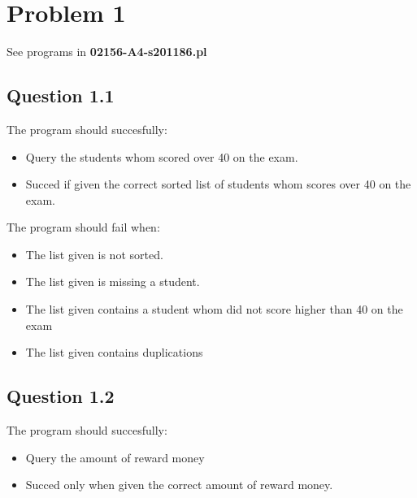 \newpage
\section*{Problem 1}
See programs in \textbf{02156-A4-s201186.pl}

\subsection*{Question 1.1}
The program should succesfully:
\begin{itemize}
    \item Query the students whom scored over 40 on the exam.
    \item Succed if given the correct sorted list of students whom scores over 40 on the exam.
\end{itemize}

The program should fail when:
\begin{itemize}
    \item The list given is not sorted.
    \item The list given is missing a student.
    \item The list given contains a student whom did not score higher than 40 on the exam
    \item The list given contains duplications
\end{itemize}
\subsection*{Question 1.2}
The program should succesfully:
\begin{itemize}
    \item Query the amount of reward money
    \item Succed only when given the correct amount of reward money.
\end{itemize}
